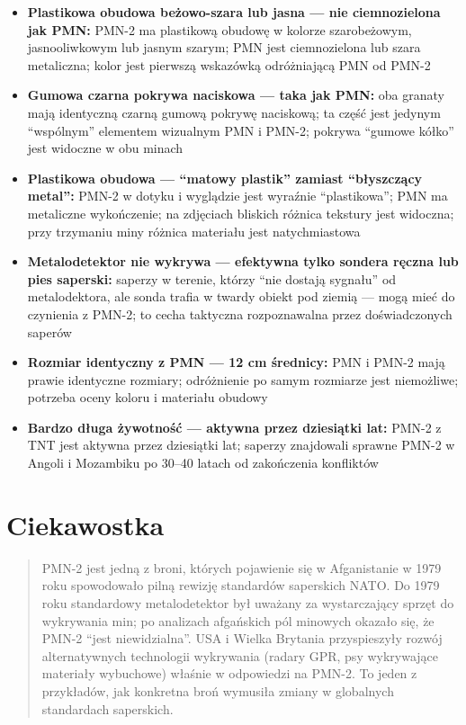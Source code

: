 \documentclass[12pt,openany,oneside]{book}
\providecommand{\tightlist}{%
  \setlength{\itemsep}{0pt}\setlength{\parskip}{0pt}}
\begin{document}
\begin{itemize}
\tightlist
\item
  \textbf{Plastikowa obudowa beżowo-szara lub jasna --- nie
  ciemnozielona jak PMN:} PMN-2 ma plastikową obudowę w kolorze
  szarobeżowym, jasnooliwkowym lub jasnym szarym; PMN jest ciemnozielona
  lub szara metaliczna; kolor jest pierwszą wskazówką odróżniającą PMN
  od PMN-2
\item
  \textbf{Gumowa czarna pokrywa naciskowa --- taka jak PMN:} oba granaty
  mają identyczną czarną gumową pokrywę naciskową; ta część jest jedynym
  ``wspólnym'' elementem wizualnym PMN i PMN-2; pokrywa ``gumowe kółko''
  jest widoczne w obu minach
\item
  \textbf{Plastikowa obudowa --- ``matowy plastik'' zamiast ``błyszczący
  metal'':} PMN-2 w dotyku i wyglądzie jest wyraźnie ``plastikowa''; PMN
  ma metaliczne wykończenie; na zdjęciach bliskich różnica tekstury jest
  widoczna; przy trzymaniu miny różnica materiału jest natychmiastowa
\item
  \textbf{Metalodetektor nie wykrywa --- efektywna tylko sondera ręczna
  lub pies saperski:} saperzy w terenie, którzy ``nie dostają sygnału''
  od metalodektora, ale sonda trafia w twardy obiekt pod ziemią --- mogą
  mieć do czynienia z PMN-2; to cecha taktyczna rozpoznawalna przez
  doświadczonych saperów
\item
  \textbf{Rozmiar identyczny z PMN --- 12 cm średnicy:} PMN i PMN-2 mają
  prawie identyczne rozmiary; odróżnienie po samym rozmiarze jest
  niemożliwe; potrzeba oceny koloru i materiału obudowy
\item
  \textbf{Bardzo długa żywotność --- aktywna przez dziesiątki lat:}
  PMN-2 z TNT jest aktywna przez dziesiątki lat; saperzy znajdowali
  sprawne PMN-2 w Angoli i Mozambiku po 30--40 latach od zakończenia
  konfliktów
\end{itemize}

\section{Ciekawostka}\label{ciekawostka-108}

\begin{quote}
PMN-2 jest jedną z broni, których pojawienie się w Afganistanie w 1979
roku spowodowało pilną rewizję standardów saperskich NATO. Do 1979 roku
standardowy metalodetektor był uważany za wystarczający sprzęt do
wykrywania min; po analizach afgańskich pól minowych okazało się, że
PMN-2 ``jest niewidzialna''. USA i Wielka Brytania przyspieszyły rozwój
alternatywnych technologii wykrywania (radary GPR, psy wykrywające
materiały wybuchowe) właśnie w odpowiedzi na PMN-2. To jeden z
przykładów, jak konkretna broń wymusiła zmiany w globalnych standardach
saperskich.
\end{quote}
\end{document}
